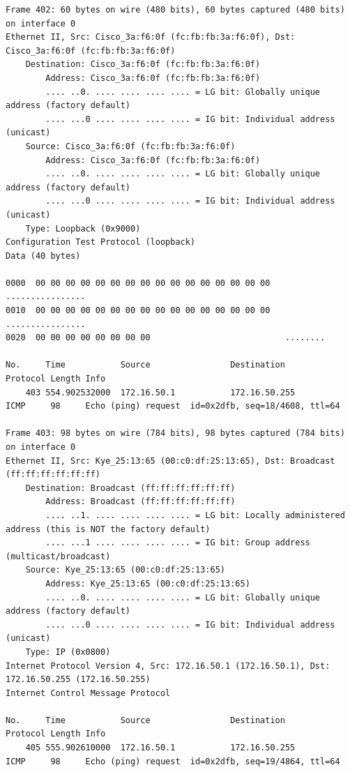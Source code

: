 \documentclass[a4paper,11pt]{article}
\begin{document}
\begin{lstlisting}
Frame 402: 60 bytes on wire (480 bits), 60 bytes captured (480 bits) on interface 0
Ethernet II, Src: Cisco_3a:f6:0f (fc:fb:fb:3a:f6:0f), Dst: Cisco_3a:f6:0f (fc:fb:fb:3a:f6:0f)
    Destination: Cisco_3a:f6:0f (fc:fb:fb:3a:f6:0f)
        Address: Cisco_3a:f6:0f (fc:fb:fb:3a:f6:0f)
        .... ..0. .... .... .... .... = LG bit: Globally unique address (factory default)
        .... ...0 .... .... .... .... = IG bit: Individual address (unicast)
    Source: Cisco_3a:f6:0f (fc:fb:fb:3a:f6:0f)
        Address: Cisco_3a:f6:0f (fc:fb:fb:3a:f6:0f)
        .... ..0. .... .... .... .... = LG bit: Globally unique address (factory default)
        .... ...0 .... .... .... .... = IG bit: Individual address (unicast)
    Type: Loopback (0x9000)
Configuration Test Protocol (loopback)
Data (40 bytes)

0000  00 00 00 00 00 00 00 00 00 00 00 00 00 00 00 00   ................
0010  00 00 00 00 00 00 00 00 00 00 00 00 00 00 00 00   ................
0020  00 00 00 00 00 00 00 00                           ........

No.     Time           Source                Destination           Protocol Length Info
    403 554.902532000  172.16.50.1           172.16.50.255         ICMP     98     Echo (ping) request  id=0x2dfb, seq=18/4608, ttl=64

Frame 403: 98 bytes on wire (784 bits), 98 bytes captured (784 bits) on interface 0
Ethernet II, Src: Kye_25:13:65 (00:c0:df:25:13:65), Dst: Broadcast (ff:ff:ff:ff:ff:ff)
    Destination: Broadcast (ff:ff:ff:ff:ff:ff)
        Address: Broadcast (ff:ff:ff:ff:ff:ff)
        .... ..1. .... .... .... .... = LG bit: Locally administered address (this is NOT the factory default)
        .... ...1 .... .... .... .... = IG bit: Group address (multicast/broadcast)
    Source: Kye_25:13:65 (00:c0:df:25:13:65)
        Address: Kye_25:13:65 (00:c0:df:25:13:65)
        .... ..0. .... .... .... .... = LG bit: Globally unique address (factory default)
        .... ...0 .... .... .... .... = IG bit: Individual address (unicast)
    Type: IP (0x0800)
Internet Protocol Version 4, Src: 172.16.50.1 (172.16.50.1), Dst: 172.16.50.255 (172.16.50.255)
Internet Control Message Protocol

No.     Time           Source                Destination           Protocol Length Info
    405 555.902610000  172.16.50.1           172.16.50.255         ICMP     98     Echo (ping) request  id=0x2dfb, seq=19/4864, ttl=64


\end{lstlisting}
\end{document}
